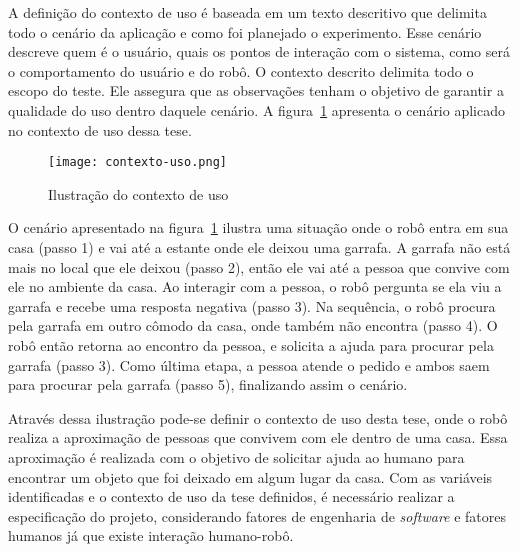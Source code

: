 A definição do contexto de uso é baseada em um texto descritivo que delimita todo o cenário da aplicação e como foi planejado o experimento. Esse cenário descreve quem é o usuário, quais os pontos de interação com o sistema, como será o comportamento do usuário e do robô. O contexto descrito delimita todo o escopo do teste. Ele assegura que as observações tenham o objetivo de garantir a qualidade do uso dentro daquele cenário. A figura~\ref{fig:contextouso} apresenta o cenário aplicado no contexto de uso dessa tese.

\begin{figure}[ht!]
	\centering
	\begin{minipage}{\textwidth}
		\caption{Ilustração do contexto de uso}
		\texttt{[image: contexto-uso.png]}
		\label{fig:contextouso}
	\end{minipage}
\end{figure}

O cenário apresentado na figura~\ref{fig:contextouso} ilustra uma situação onde o robô entra em sua casa (passo 1) e vai até a estante onde ele deixou uma garrafa. A garrafa não está mais no local que ele deixou (passo 2), então ele vai até a pessoa que convive com ele no ambiente da casa. Ao interagir com a pessoa, o robô pergunta se ela viu a garrafa e recebe uma resposta negativa (passo 3). Na sequência, o robô procura pela garrafa em outro cômodo da casa, onde também não encontra (passo 4). O robô então retorna ao encontro da pessoa, e solicita a ajuda para procurar pela garrafa (passo 3). Como última etapa, a pessoa atende o pedido e ambos saem para procurar pela garrafa (passo 5), finalizando assim o cenário.

Através dessa ilustração pode-se definir o contexto de uso desta tese, onde o robô realiza a aproximação de pessoas que convivem com ele dentro de uma casa. Essa aproximação é realizada com o objetivo de solicitar ajuda ao humano para encontrar um objeto que foi deixado em algum lugar da casa. Com as variáveis identificadas e o contexto de uso da tese definidos, é necessário realizar a especificação do projeto, considerando fatores de engenharia de \emph{software} e fatores humanos já que existe interação humano-robô.

